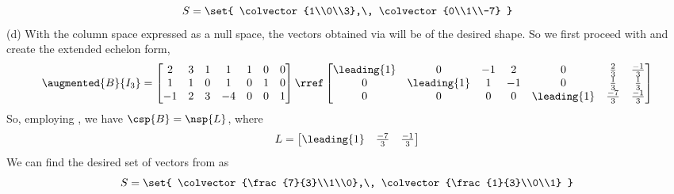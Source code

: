 \begin{equation*}
S=\set{
\colvector{1\\0\\3},\,
\colvector{0\\1\\-7}
}
\end{equation*}
%
(d)\quad 
With the column space expressed as a null space, the vectors obtained via  will be of the desired shape.  So we first proceed with  and create the extended echelon form,
%
\begin{equation*}
\augmented{B}{I_3}=
\begin{bmatrix}
2 & 3 & 1 & 1 & 1 & 0 & 0\\
1 & 1 & 0 & 1 & 0 & 1 & 0\\
-1 & 2 & 3 & -4 & 0 & 0 & 1
\end{bmatrix}
\rref
\begin{bmatrix}
\leading{1} & 0 & -1 & 2 & 0 & \frac{2}{3} & \frac{-1}{3}\\
0 & \leading{1} & 1 & -1 & 0 & \frac{1}{3} & \frac{1}{3}\\
0 & 0 & 0 & 0 & \leading{1} & \frac{-7}{3} & \frac{-1}{3}
\end{bmatrix}
\end{equation*}
So, employing , we have $\csp{B}=\nsp{L}$, where 
%
\begin{equation*}
L=
\begin{bmatrix}
\leading{1} & \frac{-7}{3} & \frac{-1}{3}
\end{bmatrix}
\end{equation*}
%
We can find the desired set of vectors from  as
%
\begin{equation*}
S=\set{
\colvector{\frac{7}{3}\\1\\0},\,
\colvector{\frac{1}{3}\\0\\1}
}
\end{equation*}
%